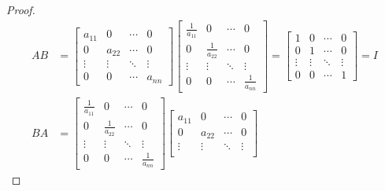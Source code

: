 \documentclass{article}
\begin{document}
\begin{enumerate}
\begin{proof}
\begin{align*}
      AB & = \begin{bmatrix}
               a_{11} & 0      & \cdots & 0      \\
               0      & a_{22} & \cdots & 0      \\
               \vdots & \vdots & \ddots & \vdots \\
               0      & 0      & \cdots & a_{nn}
             \end{bmatrix}\begin{bmatrix}
                            \frac{1}{a_{11}} & 0                & \cdots & 0                \\
                            0                & \frac{1}{a_{22}} & \cdots & 0                \\
                            \vdots           & \vdots           & \ddots & \vdots           \\
                            0                & 0                & \cdots & \frac{1}{a_{nn}}
                          \end{bmatrix} = \begin{bmatrix}
                                            1      & 0      & \cdots & 0      \\
                                            0      & 1      & \cdots & 0      \\
                                            \vdots & \vdots & \ddots & \vdots \\
                                            0      & 0      & \cdots & 1
                                          \end{bmatrix} = I \\
      BA & = \begin{bmatrix}
               \frac{1}{a_{11}} & 0                & \cdots & 0                \\
               0                & \frac{1}{a_{22}} & \cdots & 0                \\
               \vdots           & \vdots           & \ddots & \vdots           \\
               0                & 0                & \cdots & \frac{1}{a_{nn}}
             \end{bmatrix}\begin{bmatrix}
                            a_{11} & 0      & \cdots & 0      \\
                            0      & a_{22} & \cdots & 0      \\
                            \vdots & \vdots & \ddots & \vdots \\

\end{bmatrix}
\end{align*}
\end{proof}
\end{enumerate}
\end{document}

